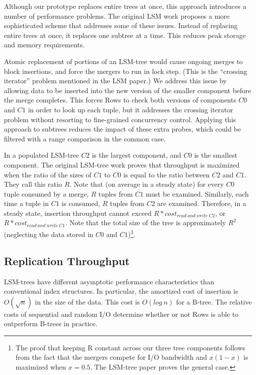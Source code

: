 \documentclass{sig-alternate-sigmod08}
\newcommand{\rows}{Rows\xspace}
\begin{document}
Although our prototype replaces entire trees at once, this approach
introduces a number of performance problems.  The original LSM work
proposes a more sophisticated scheme that addresses some of these
issues.  Instead of replacing entire trees at once, it replaces one
subtree at a time.  This reduces peak storage and memory requirements.

Atomic replacement of portions of an LSM-tree would cause ongoing
merges to block insertions, and force the mergers to run in lock step.
(This is the ``crossing iterator'' problem mentioned in the LSM
paper.)  We address this issue by allowing data to be inserted into
the new version of the smaller component before the merge completes.
This forces \rows to check both versions of components $C0$ and $C1$
in order to look up each tuple, but it addresses the crossing iterator
problem without resorting to fine-grained concurrency control.
Applying this approach to subtrees reduces the impact of these extra
probes, which could be filtered with a range comparison in the common
case.

In a populated LSM-tree $C2$ is the largest component, and $C0$ is the
smallest component.  The original LSM-tree work proves that throughput
is maximized when the ratio of the sizes of $C1$ to $C0$ is equal to
the ratio between $C2$ and $C1$.  They call this ratio $R$.  Note that
(on average in a steady state) for every $C0$ tuple consumed by a
merge, $R$ tuples from $C1$ must be examined.  Similarly, each time a
tuple in $C1$ is consumed, $R$ tuples from $C2$ are examined.
Therefore, in a steady state, insertion throughput cannot exceed $R *
cost_{read~and~write~C2}$, or $R * cost_{read~and~write~C1}$.  Note
that the total size of the tree is approximately $R^2$ (neglecting the
data stored in $C0$ and $C1$)\footnote{The proof that keeping R
  constant across our three tree components follows from the fact that
  the mergers compete for I/O bandwidth and $x(1-x)$ is maximized when
  $x=0.5$.  The LSM-tree paper proves the general case.}.

\subsection{Replication Throughput}

LSM-trees have different asymptotic performance characteristics than
conventional index structures.  In particular, the amortized cost of
insertion is $O(\sqrt{n})$ in the size of the data.  This cost is
$O(log~n)$ for a B-tree.  The relative costs of sequential
and random I/O determine whether or not \rows is able to outperform
B-trees in practice.
\end{document}
